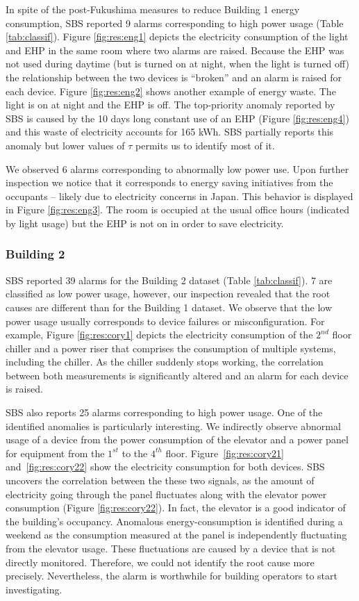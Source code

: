In spite of the post-Fukushima measures to reduce Building 1 energy consumption, 
SBS reported 9 alarms corresponding to high power usage (Table \ref{tab:classif}).
Figure \ref{fig:res:eng1} depicts the electricity consumption of the light and EHP in the same room where two alarms are raised.
Because the EHP was not used during daytime (but is turned on at night, when the light is turned off) the relationship between the two devices 
is ``broken'' and an alarm is raised for each device.
Figure \ref{fig:res:eng2} shows another example of energy waste.  The light is on at night and the EHP is off.
The top-priority anomaly reported by SBS is caused by the 10 days long constant use of an EHP (Figure \ref{fig:res:eng4}) and this 
waste of electricity accounts for 165 kWh.
SBS partially reports this anomaly but lower values of $\tau$ permits us to identify most of it.


We observed 6 alarms corresponding to abnormally low power use.  Upon further inspection we notice that it corresponds to energy saving
 initiatives from the occupants -- likely due to electricity concerns in Japan.
This behavior is displayed in Figure \ref{fig:res:eng3}.  The room is occupied at the usual office hours (indicated by light usage)  but the 
EHP is not on in order to save electricity.

\subsubsection{Building 2}
SBS reported 39 alarms for the Building 2 dataset (Table \ref{tab:classif}).
 7 are classified as low power usage, however, our inspection revealed that the root causes are different than for the Building 1 dataset.
We observe that the low power usage usually corresponds to device failures or misconfiguration.  
For example, Figure \ref{fig:res:cory1} depicts the electricity consumption of the $2^{nd}$ floor chiller and a power riser that comprises the consumption of multiple systems, including the chiller.
As the chiller suddenly stops working, the correlation between both measurements is significantly altered and an alarm for each device is raised.

SBS also reports 25 alarms corresponding to high power usage. 
One of the identified anomalies is particularly interesting.
We indirectly observe abnormal usage of a device from the power consumption of the elevator and a power panel for equipment from 
the $1^{st}$ to the $4^{th}$ floor.
Figure~\ref{fig:res:cory21} and~\ref{fig:res:cory22} show the electricity consumption for both devices. 
SBS uncovers the correlation between the these two signals, as the amount of electricity going through the panel fluctuates along with the elevator power consumption (Figure \ref{fig:res:cory22}).
In fact, the elevator is a good indicator of the building's occupancy.
Anomalous energy-consumption is identified during a weekend as the consumption measured at the panel is independently fluctuating from the elevator usage.
These fluctuations are caused by a device that is not directly monitored.  Therefore, we could not identify the root cause more precisely. 
 Nevertheless, the alarm is worthwhile for building operators to start investigating.

